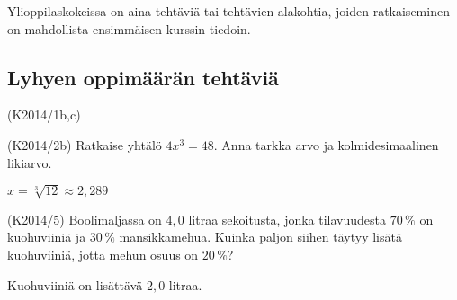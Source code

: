 Ylioppilaskokeissa on aina tehtäviä tai tehtävien alakohtia, joiden ratkaiseminen on mahdollista ensimmäisen kurssin tiedoin.


\subsection*{Lyhyen oppimäärän tehtäviä}

\begin{tehtava} (K2014/1b,c) 
    \begin{vastaus}
    \end{vastaus}	
\end{tehtava}

\begin{tehtava}(K2014/2b)
Ratkaise yhtälö $4x^3=48$. Anna tarkka arvo ja kolmidesimaalinen likiarvo.
    \begin{vastaus}

$x=\sqrt[3]{12}\approx2,289$

    \end{vastaus}	
\end{tehtava}

\begin{tehtava} (K2014/5) Boolimaljassa on $4,0$ litraa sekoitusta, jonka tilavuudesta $70\,\%$ on kuohuviiniä ja $30\,\%$ mansikkamehua. Kuinka paljon siihen täytyy lisätä kuohuviiniä, jotta mehun osuus on $20\,\%$?
    \begin{vastaus}
	    Kuohuviiniä on lisättävä $2,0$ litraa.
    \end{vastaus}
\end{tehtava}


